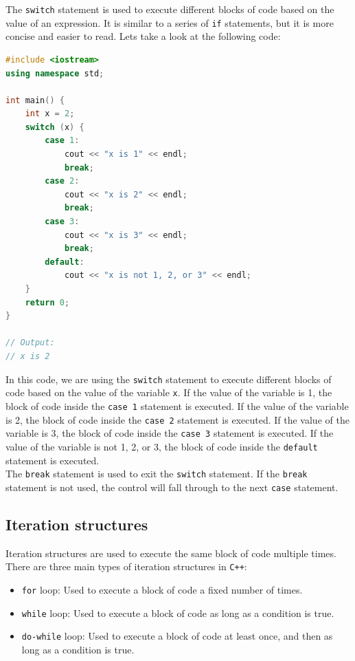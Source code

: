 The \texttt{switch} statement is used to execute different blocks of code based on the value of an expression. It
is similar to a series of \texttt{if} statements, but it is more concise and easier to read. Lets take a look at the
following code:

\begin{lstlisting}[language=C++]
#include <iostream>
using namespace std;

int main() {
    int x = 2;
    switch (x) {
        case 1:
            cout << "x is 1" << endl;
            break;
        case 2:
            cout << "x is 2" << endl;
            break;
        case 3:
            cout << "x is 3" << endl;
            break;
        default:
            cout << "x is not 1, 2, or 3" << endl;
    }
    return 0;
}

// Output:
// x is 2
\end{lstlisting}

In this code, we are using the \texttt{switch} statement to execute different blocks of code based on the value of the
variable \texttt{x}. If the value of the variable is 1, the block of code inside the \texttt{case 1} statement is executed.
If the value of the variable is 2, the block of code inside the \texttt{case 2} statement is executed. If the value of the
variable is 3, the block of code inside the \texttt{case 3} statement is executed. If the value of the variable is not 1,
2, or 3, the block of code inside the \texttt{default} statement is executed.\\

The \texttt{break} statement is used to exit the \texttt{switch} statement. If the \texttt{break} statement is not used,
the control will fall through to the next \texttt{case} statement.\\

\subsection{Iteration structures}

Iteration structures are used to execute the same block of code multiple times. There are three main types of iteration
structures in \texttt{C++}:

\begin{itemize}
    \item \texttt{for} loop: Used to execute a block of code a fixed number of times.
    \item \texttt{while} loop: Used to execute a block of code as long as a condition is true.
    \item \texttt{do-while} loop: Used to execute a block of code at least once, and then as long as a condition is true.
\end{itemize}

